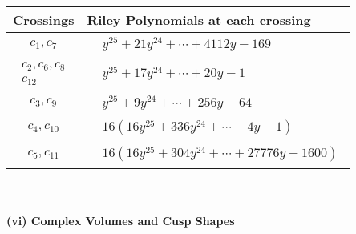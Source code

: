 \documentclass[1p]{elsarticle_modified}
\theoremstyle{definition}
\begin{document}
\begin{tabular}{m{50pt}|m{274pt}}
Crossings & \hspace{64pt}Riley Polynomials at each crossing \\
\hline $$\begin{aligned}c_{1},c_{7}\end{aligned}$$&$\begin{aligned}
&y^{25}+21 y^{24}+\cdots+4112 y-169
\end{aligned}$\\
\hline $$\begin{aligned}c_{2},c_{6},c_{8}\\c_{12}\end{aligned}$$&$\begin{aligned}
&y^{25}+17 y^{24}+\cdots+20 y-1
\end{aligned}$\\
\hline $$\begin{aligned}c_{3},c_{9}\end{aligned}$$&$\begin{aligned}
&y^{25}+9 y^{24}+\cdots+256 y-64
\end{aligned}$\\
\hline $$\begin{aligned}c_{4},c_{10}\end{aligned}$$&$\begin{aligned}
&16(16 y^{25}+336 y^{24}+\cdots-4 y-1)
\end{aligned}$\\
\hline $$\begin{aligned}c_{5},c_{11}\end{aligned}$$&$\begin{aligned}
&16(16 y^{25}+304 y^{24}+\cdots+27776 y-1600)
\end{aligned}$\\
\hline
\end{tabular}\\~\\
\newpage\flushleft \textbf{(vi) Complex Volumes and Cusp Shapes}
\end{document}
